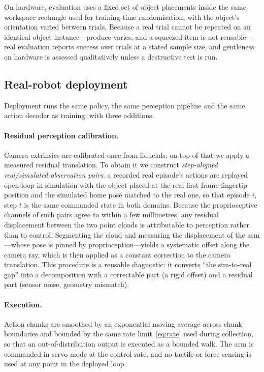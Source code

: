 On hardware, evaluation uses a fixed set of object placements inside the same workspace
rectangle used for training-time randomisation, with the object's orientation varied between
trials. Because a real trial cannot be repeated on an identical object instance---produce
varies, and a squeezed item is not reusable---real evaluation reports success over trials at
a stated sample size, and gentleness on hardware is assessed qualitatively unless a
destructive test is run.

\subsection{Real-robot deployment}
\label{sec:method:deploy}

Deployment runs the same policy, the same perception pipeline and the same action decoder as
training, with three additions.

\paragraph{Residual perception calibration.}
Camera extrinsics are calibrated once from fiducials; on top of that we apply a measured
residual translation. To obtain it we construct \emph{step-aligned real/simulated observation
pairs}: a recorded real episode's actions are replayed open-loop in simulation with the
object placed at the real first-frame fingertip position and the simulated home pose matched
to the real one, so that episode $i$, step $t$ is the same commanded state in both domains.
Because the proprioceptive channels of such pairs agree to within a few millimetres, any
residual displacement between the two point clouds is attributable to perception rather than
to control. Segmenting the cloud and measuring the displacement of the arm---whose pose is
pinned by proprioception---yields a systematic offset along the camera ray, which is then
applied as a constant correction to the camera translation. This procedure is a reusable
diagnostic: it converts ``the sim-to-real gap'' into a decomposition with a correctable part
(a rigid offset) and a residual part (sensor noise, geometry mismatch).

\paragraph{Execution.}
Action chunks are smoothed by an exponential moving average across chunk boundaries and
bounded by the same rate limit~\eqref{eq:rate} used during collection, so that an
out-of-distribution output is executed as a bounded walk. The arm is commanded in servo mode
at the control rate, and no tactile or force sensing is used at any point in the deployed
loop.

